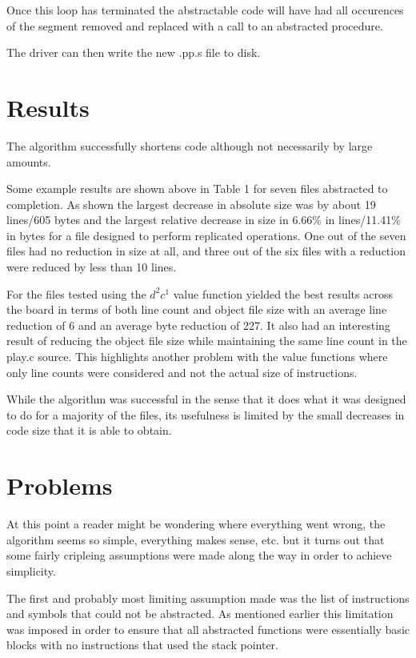 \documentclass[9pt,nocopyrightspace]{sigplanconf}
\begin{document}
Once this loop has terminated the abstractable code will have had all occurences of the segment removed and replaced with a call to an abstracted procedure.

The driver can then write the new .pp.s file to disk.

\section{Results}

The algorithm successfully shortens code although not necessarily by large amounts.

Some example results are shown above in Table 1 for seven files abstracted to completion.
As shown the largest decrease in absolute size was by about 19 lines/605 bytes and the largest relative decrease in size in 6.66\% in lines/11.41\% in bytes for a file designed to perform replicated operations.
One out of the seven files had no reduction in size at all, and three out of the six files with a reduction were reduced by less than 10 lines.

For the files tested using the $d^{2}c^{1}$ value function yielded the best results across the board in terms of both line count and object file size with an average line reduction of 6 and an average byte reduction of 227.
It also had an interesting result of reducing the object file size while maintaining the same line count in the play.c source.
This highlights another problem with the value functions where only line counts were considered and not the actual size of instructions.


While the algorithm was successful in the sense that it does what it was designed to do for a majority of the files, its usefulness is limited by the small decreases in code size that it is able to obtain.

\section{Problems}

At this point a reader might be wondering where everything went wrong, the algorithm seems so simple, everything makes sense, etc. but it turns out that some fairly cripleing assumptions were made along the way in order to achieve simplicity.

The first and probably most limiting assumption made was the list of instructions and symbols that could not be abstracted.
As mentioned earlier this limitation was imposed in order to ensure that all abstracted functions were essentially basic blocks with no instructions that used the stack pointer.
\end{document}
